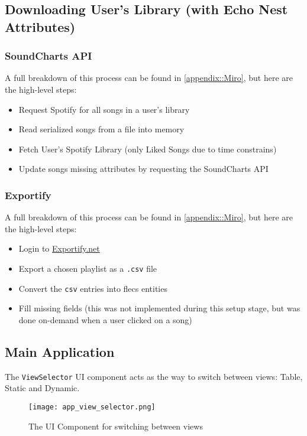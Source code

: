 \subsection{Downloading User's Library (with Echo Nest Attributes)}
\subsubsection{SoundCharts API}
A full breakdown of this process can be found in \ref{appendix::Miro}, but here are the high-level steps:\begin{itemize}
    \item Request Spotify for all songs in a user's library
    \item Read serialized songs from a file into memory
    \item Fetch User's Spotify Library (only Liked Songs due to time constrains)
    \item Update songs missing attributes by requesting the SoundCharts API
\end{itemize}

\subsubsection{Exportify}
A full breakdown of this process can be found in \ref{appendix::Miro}, but here are the high-level steps:\begin{itemize}
    \item Login to \href{https://exportify.net/}{Exportify.net}
    \item Export a chosen playlist as a \texttt{.csv} file
    \item Convert the \texttt{csv} entries into flecs entities
    \item Fill missing fields (this was not implemented during this setup stage, but was done on-demand when a user clicked on a song)
\end{itemize}

\subsection{Main Application}
The \texttt{ViewSelector} UI component acts as the way to switch between views: Table, Static and Dynamic.
\begin{figure}[h]
    \centering
    \texttt{[image: app\_view\_selector.png]}
    \caption{The UI Component for switching between views}
\end{figure}


